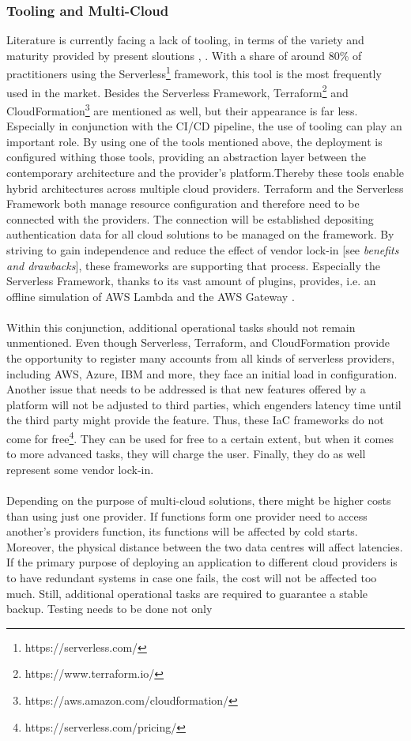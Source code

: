 \documentclass[a4paper,twoside,11pt, pagesize]{scrartcl}
\begin{document}
\begin{spacing}{1.2}
\subsubsection{Tooling and Multi-Cloud}
Literature is currently facing a lack of tooling, in terms of the variety and maturity provided by present sloutions \cite{Yussupov2019_SystematicMappingStudyFaaS}, \cite{leitner2019mixed}. With a share of around 80\% \cite{leitner2019mixed} of practitioners using the Serverless\footnote{https://serverless.com/} framework, this tool is the most frequently used in the market. Besides the Serverless Framework, Terraform\footnote{https://www.terraform.io/} and CloudFormation\footnote{https://aws.amazon.com/cloudformation/} are mentioned as well, but their appearance is far less. Especially in conjunction with the CI/CD pipeline, the use of tooling can play an important role. By using one of the tools mentioned above, the deployment is configured withing those tools, providing an abstraction layer between the contemporary architecture and the provider's platform.Thereby these tools enable hybrid architectures across multiple cloud providers. Terraform and the Serverless Framework both manage resource configuration and therefore need to be connected with the providers. The connection will be established depositing authentication data for all cloud solutions to be managed on the framework. By striving to gain independence and reduce the effect of vendor lock-in [see \textit{benefits and drawbacks}], these frameworks are supporting that process. Especially the Serverless Framework, thanks to its vast amount of plugins, provides, i.e. an offline simulation of AWS Lambda and the AWS Gateway \cite{lin2018tracking}.\\\\ Within this conjunction, additional operational tasks should not remain unmentioned. Even though Serverless, Terraform, and CloudFormation provide the opportunity to register many accounts from all kinds of serverless providers, including AWS, Azure, IBM and more, they face an initial load in configuration. Another issue that needs to be addressed is that new features offered by a platform will not be adjusted to third parties, which engenders latency time until the third party might provide the feature. Thus, these IaC frameworks do not come for free\footnote{https://serverless.com/pricing/}. They can be used for free to a certain extent, but when it comes to more advanced tasks, they will charge the user. Finally, they do as well represent some vendor lock-in.\\\\ Depending on the purpose of multi-cloud solutions, there might be higher costs than using just one provider. If functions form one provider need to access another's providers function, its functions will be affected by cold starts. Moreover, the physical distance between the two data centres will affect latencies. If the primary purpose of deploying an application to different cloud providers is to have redundant systems in case one fails, the cost will not be affected too much. Still, additional operational tasks are required to guarantee a stable backup. Testing needs to be done not only 
\end{spacing}
\end{document}
